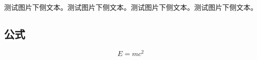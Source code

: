 测试图片下侧文本。测试图片下侧文本。测试图片下侧文本。测试图片下侧文本。

\subsection{公式}

\begin{equation}
    E = mc^{2}
\end{equation}

\pkuthssffaq %

